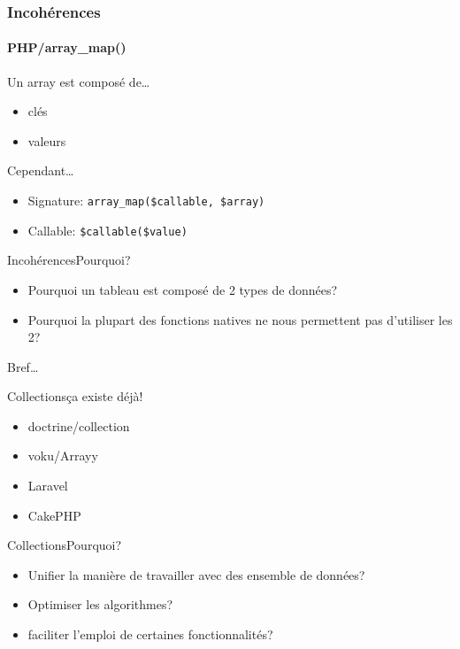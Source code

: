\begin{frame}
	\frametitle{Incohérences}
    \framesubtitle{PHP/array\_map()}

    Un array est composé de\ldots

    \begin{itemize}[<+->]
        \item clés
        \item valeurs
    \end{itemize}

    \pause

    Cependant\ldots

    \pause

    \begin{itemize}[<+->]
        \item Signature: \texttt{array\_map(\$callable, \$array)}
        \item Callable: \texttt{\$callable(\$value)}
    \end{itemize}
\end{frame}

\begin{frame}{Incohérences}{Pourquoi?}
    \begin{itemize}[<+->]
        \item Pourquoi un tableau est composé de 2 types de données?
        \item Pourquoi la plupart des fonctions natives ne nous permettent pas d'utiliser les 2?
    \end{itemize}
\end{frame}

\begin{frameC}{Bref\ldots}\end{frameC}

\begin{frame}{Collections}{ça existe déjà!}
    \begin{itemize}[<+->]
        \item doctrine/collection
        \item voku/Arrayy
        \item Laravel
        \item CakePHP
    \end{itemize}
\end{frame}

\begin{frame}{Collections}{Pourquoi?}
    \begin{itemize}[<+->]
        \item Unifier la manière de travailler avec des ensemble de données?
        \item Optimiser les algorithmes?
        \item faciliter l'emploi de certaines fonctionnalités?
    \end{itemize}
\end{frame}

